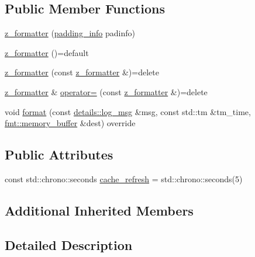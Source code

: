 \subsection*{Public Member Functions}
\begin{DoxyCompactItemize}
\item 
\hyperlink{classspdlog_1_1details_1_1z__formatter_a3c7902ee9047ef7c0d53cf1e9c4cd834}{z\+\_\+formatter} (\hyperlink{structspdlog_1_1details_1_1padding__info}{padding\+\_\+info} padinfo)
\item 
\hyperlink{classspdlog_1_1details_1_1z__formatter_a230a4469c1ffda4d06bed933ecca1fd5}{z\+\_\+formatter} ()=default
\item 
\hyperlink{classspdlog_1_1details_1_1z__formatter_a09f0b7e5cf2bc8260375d38ac9b14a31}{z\+\_\+formatter} (const \hyperlink{classspdlog_1_1details_1_1z__formatter}{z\+\_\+formatter} \&)=delete
\item 
\hyperlink{classspdlog_1_1details_1_1z__formatter}{z\+\_\+formatter} \& \hyperlink{classspdlog_1_1details_1_1z__formatter_aea05e7a7a960bb9450b00aa9558e78fe}{operator=} (const \hyperlink{classspdlog_1_1details_1_1z__formatter}{z\+\_\+formatter} \&)=delete
\item 
void \hyperlink{classspdlog_1_1details_1_1z__formatter_ada7a5e9a3c30039cbfb684b7743b8945}{format} (const \hyperlink{structspdlog_1_1details_1_1log__msg}{details\+::log\+\_\+msg} \&msg, const std\+::tm \&tm\+\_\+time, \hyperlink{format_8h_a21cbf729f69302f578e6db21c5e9e0d2}{fmt\+::memory\+\_\+buffer} \&dest) override
\end{DoxyCompactItemize}
\subsection*{Public Attributes}
\begin{DoxyCompactItemize}
\item 
const std\+::chrono\+::seconds \hyperlink{classspdlog_1_1details_1_1z__formatter_a804a8b5035af28939f4803033c951edc}{cache\+\_\+refresh} = std\+::chrono\+::seconds(5)
\end{DoxyCompactItemize}
\subsection*{Additional Inherited Members}


\subsection{Detailed Description}


